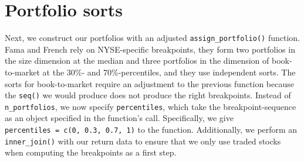 \documentclass[
]{book}
\begin{document}
\hypertarget{portfolio-sorts}{%
\section{Portfolio sorts}\label{portfolio-sorts}}

Next, we construct our portfolios with an adjusted \texttt{assign\_portfolio()} function. Fama and French rely on NYSE-specific breakpoints, they form two portfolios in the size dimension at the median and three portfolios in the dimension of book-to-market at the 30\%- and 70\%-percentiles, and they use independent sorts. The sorts for book-to-market require an adjustment to the previous function because the \texttt{seq()} we would produce does not produce the right breakpoints. Instead of \texttt{n\_portfolios}, we now specify \texttt{percentiles}, which take the breakpoint-sequence as an object specified in the function's call. Specifically, we give \texttt{percentiles\ =\ c(0,\ 0.3,\ 0.7,\ 1)} to the function. Additionally, we perform an \texttt{inner\_join()} with our return data to ensure that we only use traded stocks when computing the breakpoints as a first step.
\end{document}
